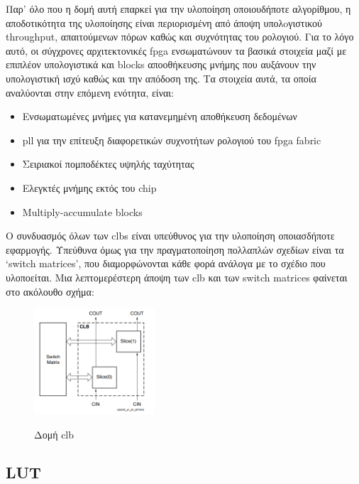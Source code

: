 Παρ' όλο που η δομή αυτή επαρκεί για την υλοποίηση οποιουδήποτε αλγορίθμου, η αποδοτικότητα της υλοποίησης είναι περιορισμένη από άποψη υπολoγιστικού \gls{throughput}, απαιτούμενων πόρων καθώς και συχνότητας του ρολογιού. Για το λόγο αυτό, οι σύγχρονες αρχιτεκτονικές \gls{fpga} ενσωματώνουν τα βασικά στοιχεία μαζί με επιπλέον υπολογιστικά και blocks αποοθήκευσης μνήμης που αυξάνουν την υπολογιστική ισχύ καθώς και την απόδοση της. Τα στοιχεία αυτά, τα οποία αναλύονται στην επόμενη ενότητα, είναι:
\begin{itemize}
\item Ενσωματωμένες μνήμες για κατανεμημένη αποθήκευση δεδομένων
\item \gls{pll} για την επίτευξη διαφορετικών συχνοτήτων ρολογιού του \gls{fpga} fabric
\item Σειριακοί πομποδέκτες υψηλής ταχύτητας
\item Ελεγκτές μνήμης εκτός του chip
\item Multiply-accumulate blocks \\
\end{itemize}

Ο συνδυασμός όλων των \gls{clb}s είναι υπεύθυνος για την υλοποίηση οποιασδήποτε εφαρμογής. Υπεύθυνα όμως για την πραγματοποίηση πολλαπλών σχεδίων είναι τα `switch matrices', που διαμορφώνονται κάθε φορά ανάλογα με το σχέδιο που υλοποείται. Μια λεπτομερέστερη άποψη των \gls{clb} και των switch matrices φαίνεται στο ακόλουθο σχήμα:
\begin{figure}[H]
  	\centering
	\includegraphics[width=0.4\textwidth]{images/clb}\\
	\caption{Δομή \gls{clb} \cite{clb}}
\end{figure}
\subsection{LUT}

